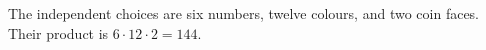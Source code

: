 The independent choices are six numbers, twelve colours, and two coin faces. Their product is $6\cdot12\cdot2=\boxed{144}$.
